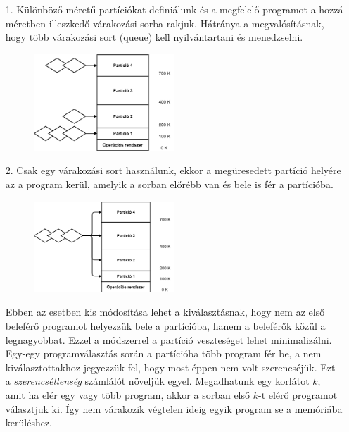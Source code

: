 \documentclass[tikz,12pt,margin=0px]{article}
\begin{document}
    \begin{enumerate}[topsep=8pt,itemsep=4pt,partopsep=4pt, parsep=4pt]
        \item[1.] Különböző méretű partíciókat definiálunk és a megfelelő programot a hozzá méretben illeszkedő várakozási sorba rakjuk. Hátránya a megvalósításnak, hogy több várakozási sort (queue) kell nyilvántartani és menedzselni.

        \begin{figure}[H]
            \centering
            \includegraphics[width=0.5\textwidth]{img/memory_partitioning_individial_queue.png}
            \caption{}
            \label{memorymanagement_partitioning_iq}
        \end{figure}

        \item[2.] Csak egy várakozási sort használunk, ekkor a megüresedett partíció helyére az a program kerül, amelyik a sorban előrébb van és bele is fér a partícióba.

        \begin{figure}[H]
            \centering
            \includegraphics[width=0.5\textwidth]{img/memory_partitioning_single_queue.png}
            \caption{}
            \label{memorymanagement_partitioning_sq}
        \end{figure}

         Ebben az esetben kis módosítása lehet a kiválasztásnak, hogy nem az első beleférő programot helyezzük bele a partícióba, hanem a beleférők közül a legnagyobbat. Ezzel a módszerrel a partíció veszteséget lehet minimalizálni. \\

         Egy-egy programválasztás során a partícióba több program fér be, a nem kiválasztottakhoz jegyezzük fel, hogy most éppen nem volt szerencséjük. Ezt a \emph{szerencsétlenség} számlálót növeljük egyel. Megadhatunk egy korlátot $k$, amit ha elér egy vagy több program, akkor a sorban első $k$-t elérő programot választjuk ki. Így nem várakozik végtelen ideig egyik program se a memóriába kerüléshez.
    \end{enumerate}
	
\end{document}
